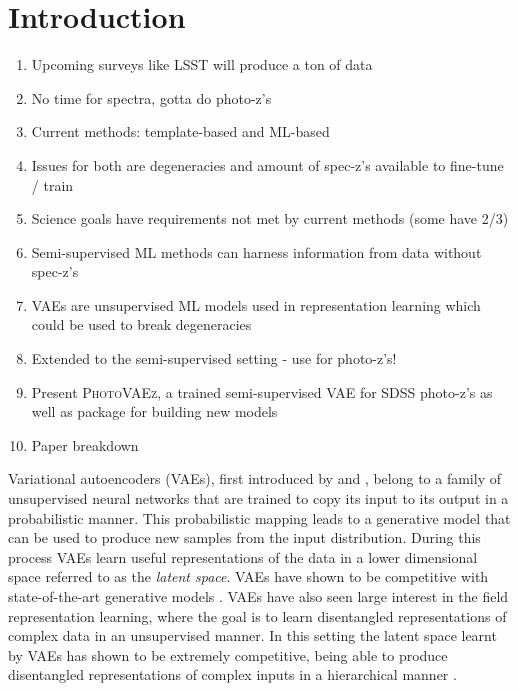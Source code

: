 \section{Introduction}
\label{sec:intro}

\begin{enumerate}
    \item Upcoming surveys like LSST will produce a ton of data
    \item No time for spectra, gotta do photo-z's
    \item Current methods: template-based and ML-based
    \item Issues for both are degeneracies and amount of spec-z's available to fine-tune / train
    \item Science goals have requirements not met by current methods (some have 2/3)
    \item Semi-supervised ML methods can harness information from data without spec-z's
    \item VAEs are unsupervised ML models used in representation learning which could be used to break degeneracies
    \item Extended to the semi-supervised setting - use for photo-z's!
    \item Present \textsc{PhotoVAEz}, a trained semi-supervised VAE for SDSS photo-z's as well as package for building new models
    \item Paper breakdown
\end{enumerate}

Variational autoencoders (VAEs), first introduced by \citet{kingmaAutoEncodingVariationalBayes2022} and \cite{rezendeStochasticBackpropagationApproximate2014}, belong to a family of unsupervised neural networks that are trained to copy its input to its output in a probabilistic manner. This probabilistic mapping leads to a generative model that can be used to produce new samples from the input distribution. 
During this process VAEs learn useful representations of the data in a lower dimensional space referred to as the \textit{latent space}. VAEs have shown to be competitive with state-of-the-art generative models \citep{childVeryDeepVAEs2021, vahdatNVAEDeepHierarchical2021, maaloeBIVAVeryDeep2019}. VAEs have also seen large interest in the field representation learning, where the goal is to learn disentangled representations of complex data in an unsupervised manner.
In this setting the latent space learnt by VAEs has shown to be extremely competitive, being able to produce disentangled representations of complex inputs in a hierarchical manner \cite{siddharthLearningDisentangledRepresentations2017}. 

